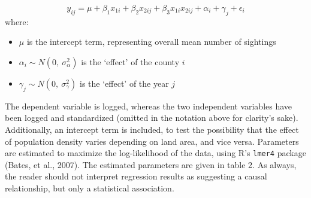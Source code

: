 \documentclass[]{elsarticle} %
\providecommand{\tightlist}{%
  \setlength{\itemsep}{0pt}\setlength{\parskip}{0pt}}
\begin{document}
\[y_{ij} = \mu + \beta_1 x_{1i} + \beta_2 x_{2ij} + \beta_3 x_{1i} x_{2ij} + \alpha_i + \gamma_j + \epsilon_{i}\]
where:

\begin{itemize}
\tightlist
\item
  \(\mu\) is the intercept term, representing overall mean number of
  sightings
\item
  \(\alpha_i \sim N(0,~ \sigma^2_{\alpha})\) is the `effect' of the
  county \(i\)
\item
  \(\gamma_j \sim N(0,~ \sigma^2_{\gamma})\) is the `effect' of the year
  \(j\)
\end{itemize}

The dependent variable is logged, whereas the two independent variables
have been logged and standardized (omitted in the notation above for
clarity's sake). Additionally, an intercept term is included, to test
the possibility that the effect of population density varies depending
on land area, and vice versa. Parameters are estimated to maximize the
log-likelihood of the data, using R's \texttt{lmer4} package (Bates, et
al., 2007). The estimated parameters are given in table 2. As always,
the reader should not interpret regression results as suggesting a
causal relationship, but only a statistical association.
\end{document}
